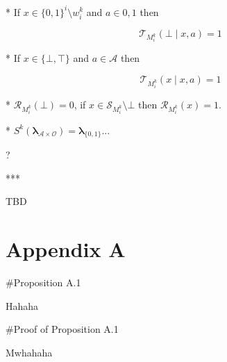 \documentclass[a4paper]{article}
\newcommand{\Bool}{\{0,1\}}
\newcommand{\Estr}{\boldsymbol{\lambda}}
\newcommand{\Ob}{\mathcal{O}}
\newcommand{\A}{\mathcal{A}}
\newcommand{\St}{\mathcal{S}}
\newcommand{\T}{\mathcal{T}}
\newcommand{\R}{\mathcal{R}}
\newcommand{\MF}{M^{\text{F}}}
\begin{document}
* If $x \in \Bool^i \setminus w_i^k$ and $a \in {0,1}$ then

$$\T_{M_i^k}(\bot \mid x,a) = 1$$

* If $x \in \{\bot,\top\}$ and $a \in \A$ then

$$\T_{M_i^k}(x \mid x,a) = 1$$

* $\R_{M_i^k}(\bot)=0$, if $x \in \St_{M_i^k} \setminus \bot$ then $\R_{M_i^k}(x)=1$.

* $S^k(\Estr_{\A \times \Ob})=\Estr_{\Bool}$...

?

***

TBD


\section{Appendix A}

\#Proposition A.1

Hahaha

\#Proof of Proposition A.1

Mwhahaha
\end{document}
